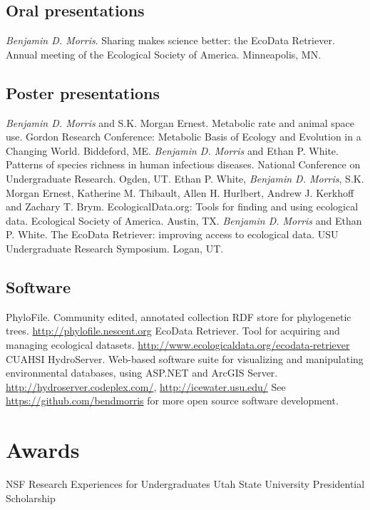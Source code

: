 \documentclass[11pt,letter]{moderncv}
\begin{document}
\subsection{Oral presentations}
 {
    \emph{Benjamin D. Morris}. Sharing makes science better: the EcoData Retriever. Annual meeting of the 
Ecological Society of America. Minneapolis, MN.
}


\subsection{Poster presentations}
 {
    \emph{Benjamin D. Morris} and S.K. Morgan Ernest. Metabolic rate and animal space use. Gordon Research Conference: Metabolic Basis of Ecology and Evolution in a Changing World. Biddeford, ME.
}
\cvline{} {
    \emph{Benjamin D. Morris} and Ethan P. White. Patterns of species richness in human infectious diseases. National Conference on Undergraduate Research. Ogden, UT.
}
 {
    Ethan P. White, \emph{Benjamin D. Morris}, S.K. Morgan Ernest, Katherine M. Thibault, Allen H. Hurlbert, Andrew J. Kerkhoff and Zachary T. Brym. EcologicalData.org: Tools for finding and using ecological data. Ecological Society of America. Austin, TX.
}
 {
    \emph{Benjamin D. Morris} and Ethan P. White. The EcoData Retriever: improving access to ecological data. USU Undergraduate Research Symposium. Logan, UT.
}


\subsection{Software}
 {
    PhyloFile. Community edited, annotated collection RDF store for phylogenetic trees.
    \newline \url{http://phylofile.nescent.org}
}
\cvline{} {
    EcoData Retriever. Tool for acquiring and managing ecological datasets.
    \newline \url{http://www.ecologicaldata.org/ecodata-retriever}
}
 {
    CUAHSI HydroServer. Web-based software suite for visualizing and manipulating environmental databases, using ASP.NET and ArcGIS Server.
    \newline \url{http://hydroserver.codeplex.com/}, \url{http://icewater.usu.edu/}
}
 {
    See \url{https://github.com/bendmorris} for more open source software development.
}


\section{Awards}
 {NSF Research Experiences for Undergraduates}
 {Utah State University Presidential Scholarship}
\end{document}

